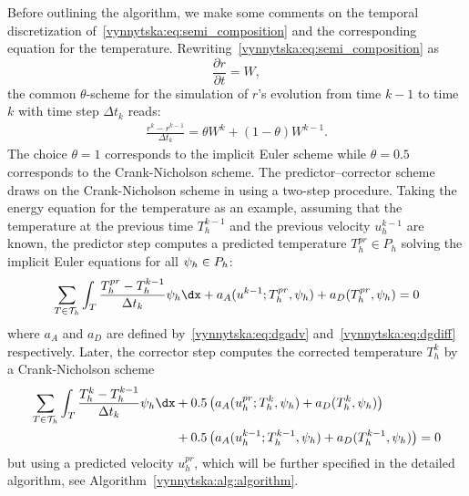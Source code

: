 Before outlining the algorithm, we make some comments on the temporal
discretization of~\eqref{vynnytska:eq:semi_composition} and the
corresponding equation for the
temperature. Rewriting~\eqref{vynnytska:eq:semi_composition} as
\begin{equation}
  \frac{\partial r}{\partial t} = W,
\end{equation}
the common $\theta$-scheme for the simulation of $r$'s evolution from
time $k-1$ to time $k$ with time step $\Delta t_k$ reads:
\begin{align}
  \label{vynnytska:eq:thetascheme}
  \frac{r^k - r^{k-1}}{\Delta t_k} = \theta W^k + (1 - \theta) W^{k-1}.
\end{align}
The choice $\theta = 1$ corresponds to the implicit Euler scheme while
$\theta = 0.5$ corresponds to the Crank-Nicholson scheme. The
predictor--corrector scheme draws on the Crank-Nicholson scheme in
using a two-step procedure. Taking the energy equation for the
temperature as an example, assuming that the temperature at the
previous time $T_h^{k-1}$ and the previous velocity $u_h^{k-1}$ are
known, the predictor step computes a predicted temperature $T_h^{pr}
\in P_h$ solving the implicit Euler equations for all $\psi_h \in
P_h$:
\begin{equation}
  \label{vynnytska:eq:predictor}
  \sum_{T \in \triang_h}
  \int_T \frac{T_h^{pr} - T_h^{k-1}}{\Delta t_k} \test_h \dx
  + a_{A} (u^{k-1}; T_h^{pr}, \test_h) + a_D (T_h^{pr}, \test_h) = 0
\end{equation}
 where $a_A$ and $a_D$ are defined
by~\eqref{vynnytska:eq:dgadv} and~\eqref{vynnytska:eq:dgdiff}
respectively. Later, the corrector step computes the corrected
temperature $T_h^k$ by a Crank-Nicholson scheme
\begin{equation}
  \label{vynnytska:eq:corrector}
  \begin{split}
    \sum_{T \in \triang_h}
    \int_T \frac{T_h^k - T_h^{k-1}}{\Delta t_k} \test_h \dx
    &+ 0.5 \left( a_{A} (u_h^{pr}; T_h^{k}, \test_h)
    + a_D (T_h^{k}, \test_h) \right) \\
    &+ 0.5 \left( a_{A} (u_h^{k-1}; T_h^{k-1}, \test_h)
    + a_D (T_h^{k-1}, \test_h) \right) = 0
  \end{split}
\end{equation}
but using a predicted velocity $u_h^{pr}$, which will be further
specified in the detailed algorithm, see
Algorithm~\ref{vynnytska:alg:algorithm}.
